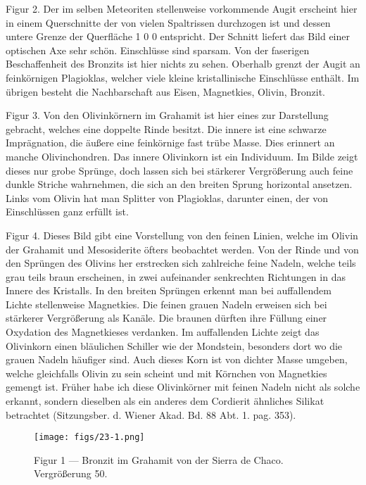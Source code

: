 \documentclass[a4paper, 11pt, oneside, polutonikogreek, german]{article}
\begin{document}
Figur 2. Der im selben Meteoriten stellenweise vorkommende Augit erscheint hier in einem Querschnitte der von vielen Spaltrissen durchzogen ist und dessen untere Grenze der Querfläche 1 0 0 entspricht. Der Schnitt liefert das Bild einer optischen Axe sehr schön. Einschlüsse sind sparsam. Von der faserigen Beschaffenheit des Bronzits ist hier nichts zu sehen. Oberhalb grenzt der Augit an feinkörnigen Plagioklas, welcher viele kleine kristallinische Einschlüsse enthält. Im übrigen besteht die Nachbarschaft aus Eisen, Magnetkies, Olivin, Bronzit.

Figur 3. Von den Olivinkörnern im Grahamit ist hier eines zur Darstellung gebracht, welches eine doppelte Rinde besitzt. Die innere ist eine schwarze Imprägnation, die äußere eine feinkörnige fast trübe Masse. Dies erinnert an manche Olivinchondren. Das innere Olivinkorn ist ein Individuum. Im Bilde zeigt dieses nur grobe Sprünge, doch lassen sich bei stärkerer Vergrößerung auch feine dunkle Striche wahrnehmen, die sich an den breiten Sprung horizontal ansetzen. Links vom Olivin hat man Splitter von Plagioklas, darunter einen, der von Einschlüssen ganz erfüllt ist.

Figur 4. Dieses Bild gibt eine Vorstellung von den feinen Linien, welche im Olivin der Grahamit und Mesosiderite öfters beobachtet werden. Von der Rinde und von den Sprüngen des Olivins her erstrecken sich zahlreiche feine Nadeln, welche teils grau teils braun erscheinen, in zwei aufeinander senkrechten Richtungen in das Innere des Kristalls. In den breiten Sprüngen erkennt man bei auffallendem Lichte stellenweise Magnetkies. Die feinen grauen Nadeln erweisen sich bei stärkerer Vergrößerung als Kanäle. Die braunen dürften ihre Füllung einer Oxydation des Magnetkieses verdanken. Im auffallenden Lichte zeigt das Olivinkorn einen bläulichen Schiller wie der Mondstein, besonders dort wo die grauen Nadeln häufiger sind. Auch dieses Korn ist von dichter Masse umgeben, welche gleichfalls Olivin zu sein scheint und mit Körnchen von Magnetkies gemengt ist. Früher habe ich diese Olivinkörner mit feinen Nadeln nicht als solche erkannt, sondern dieselben als ein anderes dem Cordierit ähnliches Silikat betrachtet (Sitzungsber. d. Wiener Akad. Bd. 88 Abt. 1. pag. 353).
\clearpage

\vspace*{\fill}
\begin{figure}[H]
\centering
\texttt{[image: figs/23-1.png]}
\caption{\small Figur 1 --- Bronzit im Grahamit von der Sierra de Chaco. Vergrößerung 50.}
\end{figure}
\vspace*{\fill}
\clearpage
\end{document}

